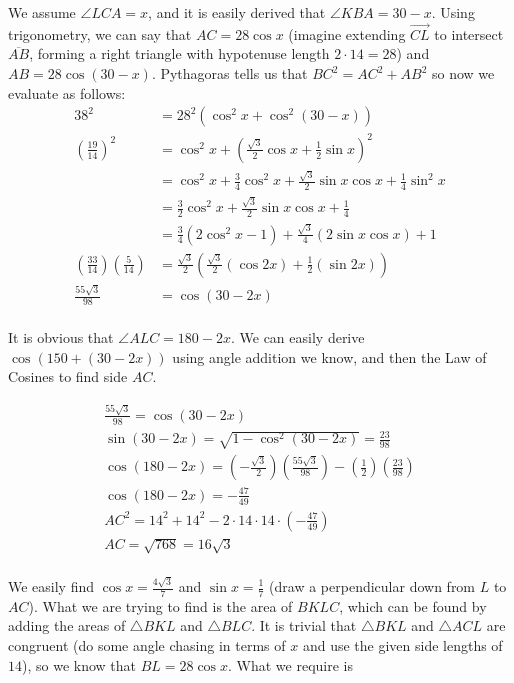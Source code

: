 \begin{enumerate}
 We assume $\angle{LCA}=x$, and it is easily derived that $\angle{KBA}=30-x$. Using trigonometry, we can say that $AC=28\cos{x}$ (imagine extending $\overrightarrow{CL}$ to intersect $\overline{AB}$, forming a right triangle with hypotenuse length $2\cdot14=28$) and $AB=28\cos{(30-x)}$. Pythagoras tells us that $BC^2=AC^2+AB^2$ so now we evaluate as follows:\begin{align*}38^2 &=28^2(\cos^2{x}+\cos^2{(30-x)}) \\(\frac{19}{14})^2 &=\cos^2{x}+(\frac{\sqrt{3}}{2} \cos{x} + \frac{1}{2} \sin{x})^2 \\&=\cos^2{x}+\frac{3}{4} \cos^2{x}+\frac{\sqrt{3}}{2}\sin{x} \cos{x}+\frac{1}{4}\sin^2{x} \\&=\frac{3}{2} \cos^2{x}+\frac{\sqrt{3}}{2}\sin{x} \cos{x}+\frac{1}{4} \\&=\frac{3}{4}(2\cos^2{x}-1)+\frac{\sqrt{3}}{4} (2\sin{x} \cos{x})+1 \\(\frac{33}{14})(\frac{5}{14})&=\frac{\sqrt{3}}{2}(\frac{\sqrt{3}}{2}(\cos{2x})+\frac{1}{2} (\sin{2x})) \\\frac{55\sqrt{3}}{98}&=\cos{(30-2x)} \\\end{align*}


 It is obvious that $\angle{ALC}=180-2x$. We can easily derive $\cos{(150+(30-2x))}$ using angle addition we know, and then the Law of Cosines to find side $AC$.

 \begin{align*}\frac{55\sqrt{3}}{98}=\cos{(30-2x)} \\\sin{(30-2x)}=\sqrt{1-\cos^2{(30-2x)}}=\frac{23}{98} \\\cos{(180-2x)}=(-\frac{\sqrt{3}}{2})(\frac{55\sqrt{3}}{98})-(\frac{1}{2})(\frac{23}{98}) \\\cos{(180-2x)}=-\frac{47}{49} \\AC^2=14^2+14^2-2\cdot 14\cdot 14\cdot (-\frac{47}{49}) \\AC=\sqrt{768}=16\sqrt3 \\\end{align*}


 We easily find $\cos{x}=\frac{4\sqrt{3}}{7}$ and $\sin{x}=\frac{1}{7}$ (draw a perpendicular down from $L$ to $AC$). What we are trying to find is the area of $BKLC$, which can be found by adding the areas of $\triangle{BKL}$ and $\triangle{BLC}$. It is trivial that $\triangle{BKL}$ and $\triangle{ACL}$ are congruent (do some angle chasing in terms of $x$ and use the given side lengths of $14$), so we know that $BL=28\cos{x}$. What we require is


\end{enumerate}
